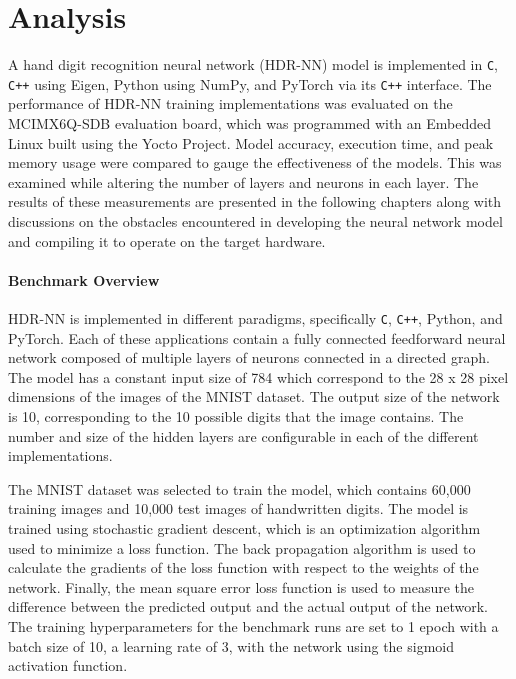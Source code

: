 \part{Analysis}

A hand digit recognition neural network (HDR-NN) model is implemented in \texttt{C}, \texttt{C++} using Eigen, Python using NumPy, and PyTorch via its \texttt{C++} interface. The performance of HDR-NN training implementations was evaluated on the MCIMX6Q-SDB evaluation board, which was programmed with an Embedded Linux built using the Yocto Project. Model accuracy, execution time, and peak memory usage were compared to gauge the effectiveness of the models. This was examined while altering the number of layers and neurons in each layer. The results of these measurements are presented in the following chapters along with discussions on the obstacles encountered in developing the neural network model and compiling it to operate on the target hardware.

\subsection*{Benchmark Overview}

HDR-NN is implemented in different paradigms, specifically \texttt{C}, \texttt{C++}, Python, and PyTorch. Each of these applications contain a fully connected feedforward neural network composed of multiple layers of neurons connected in a directed graph. The model has a constant input size of 784 which correspond to the 28 x 28 pixel dimensions of the images of the MNIST dataset. The output size of the network is 10, corresponding to the 10 possible digits that the image contains. The number and size of the hidden layers are configurable in each of the different implementations.

The MNIST dataset was selected to train the model, which contains 60,000 training images and 10,000 test images of handwritten digits. The model is trained using stochastic gradient descent, which is an optimization algorithm used to minimize a loss function. The back propagation algorithm is used to calculate the gradients of the loss function with respect to the weights of the network. Finally, the mean square error loss function is used to measure the difference between the predicted output and the actual output of the network. The training hyperparameters for the benchmark runs are set to 1 epoch with a batch size of 10, a learning rate of 3, with the network using the sigmoid activation function.

